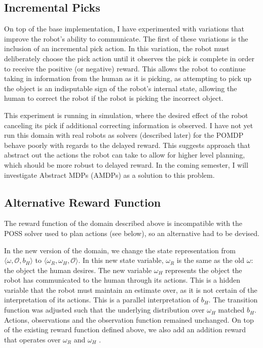 \documentclass{article}
\begin{document}
\subsection{Incremental Picks}

On top of the base implementation, I have experimented with variations that improve the robot's ability to communicate. The first of these variations is the inclusion of an incremental pick action. In this variation, the robot must deliberately choose the pick action until it observes the pick is complete in order to receive the positive (or negative) reward. This allows the robot to continue taking in information from the human as it is picking, as attempting to pick up the object is an indisputable sign of the robot's internal state, allowing the human to correct the robot if the robot is picking the incorrect object. 

This experiment is running in simulation, where the desired effect of the robot canceling its pick if additional correcting information is observed. I have not yet run this domain with real robots as solvers (described later) for the POMDP behave poorly with regards to the delayed reward. This suggests approach that abstract out the actions the robot can take to allow for higher level planning, which should be more robust to delayed reward. In the coming semester, I will investigate Abstract MDPs (AMDPs) as a solution to this problem. 

\subsection{Alternative Reward Function}

The reward function of the domain described above is incompatible with the POSS solver used to plan actions (see below), so an alternative had to be devised. 

In the new version of the domain, we change the state representation from $\langle \omega, \mathcal{O}, b_H \rangle$ to $\langle \omega_R, \omega_H, \mathcal{O}\rangle$. In this new state variable, $\omega_R$ is the same as the old $\omega$: the object the human desires. The new variable $\omega_H$ represents the object the robot has communicated to the human through its actions. This is a hidden variable that the robot must maintain an estimate over, as it is not certain of the interpretation of its actions. This is a parallel interpretation of $b_H$. The transition function was adjusted such that the underlying distribution over $\omega_H$ matched $b_H$. Actions, observations and the observation function remained unchanged. On top of the existing reward function defined above, we also add an addition reward that operates over $\omega_R$ and $\omega_H$ . 
\end{document}
